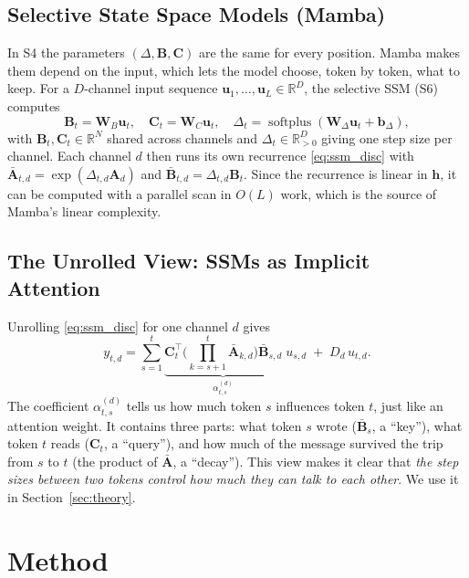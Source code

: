 \documentclass[journal]{IEEEtran}
\newcommand{\R}{\mathbb{R}}
\newcommand{\vect}[1]{\bm{#1}}
\newcommand{\softplus}{\operatorname{softplus}}
\newcommand{\Dt}{\Delta}
\begin{document}
\subsection{Selective State Space Models (Mamba)}
In S4 the parameters $(\Dt,\vect{B},\vect{C})$ are the same for every position. Mamba \cite{gu2023mamba} makes them depend on the input, which lets the model choose, token by token, what to keep. For a $D$-channel input sequence $\vect{u}_1,\dots,\vect{u}_L\in\R^{D}$, the selective SSM (S6) computes
\begin{equation}
  \vect{B}_t = \vect{W}_B\vect{u}_t,\quad \vect{C}_t = \vect{W}_C\vect{u}_t,\quad \Dt_t = \softplus(\vect{W}_\Dt\vect{u}_t + \vect{b}_\Dt),
  \label{eq:s6}
\end{equation}
with $\vect{B}_t,\vect{C}_t\in\R^{N}$ shared across channels and $\Dt_t\in\R^{D}_{>0}$ giving one step size per channel. Each channel $d$ then runs its own recurrence \eqref{eq:ssm_disc} with $\bar{\vect{A}}_{t,d}=\exp(\Dt_{t,d}\vect{A}_d)$ and $\bar{\vect{B}}_{t,d}=\Dt_{t,d}\vect{B}_t$. Since the recurrence is linear in $\vect{h}$, it can be computed with a parallel scan in $O(L)$ work, which is the source of Mamba's linear complexity.

\subsection{The Unrolled View: SSMs as Implicit Attention}
Unrolling \eqref{eq:ssm_disc} for one channel $d$ gives \cite{ali2024hidden,dao2024mamba2}
\begin{equation}
  y_{t,d} = \sum_{s=1}^{t} \underbrace{\vect{C}_t^{\top}\Big(\prod_{k=s+1}^{t}\bar{\vect{A}}_{k,d}\Big)\bar{\vect{B}}_{s,d}}_{\alpha^{(d)}_{t,s}}\; u_{s,d} \;+\; D_d\,u_{t,d}.
  \label{eq:unrolled}
\end{equation}
The coefficient $\alpha^{(d)}_{t,s}$ tells us how much token $s$ influences token $t$, just like an attention weight. It contains three parts: what token $s$ wrote ($\bar{\vect{B}}_{s}$, a ``key''), what token $t$ reads ($\vect{C}_t$, a ``query''), and how much of the message survived the trip from $s$ to $t$ (the product of $\bar{\vect{A}}$, a ``decay''). This view makes it clear that \emph{the step sizes between two tokens control how much they can talk to each other}. We use it in Section~\ref{sec:theory}.

\section{Method}
\label{sec:method}
\end{document}
